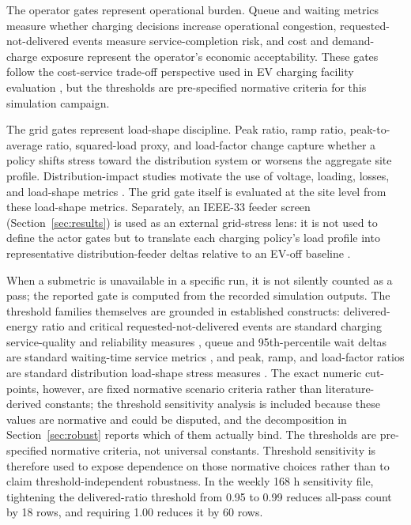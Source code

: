 \documentclass[12pt]{article}
\begin{document}
The operator gates represent operational burden. Queue and waiting metrics measure whether charging decisions increase operational congestion, requested-not-delivered events measure service-completion risk, and cost and demand-charge exposure represent the operator's economic acceptability. These gates follow the cost-service trade-off perspective used in EV charging facility evaluation \cite{woo2021}, but the thresholds are pre-specified normative criteria for this simulation campaign.

The grid gates represent load-shape discipline. Peak ratio, ramp ratio, peak-to-average ratio, squared-load proxy, and load-factor change capture whether a policy shifts stress toward the distribution system or worsens the aggregate site profile. Distribution-impact studies motivate the use of voltage, loading, losses, and load-shape metrics \cite{clement2010,elnozahy2014,green2011,muratori2018,dubey2015,pieltain2011,powell2022}. The grid gate itself is evaluated at the site level from these load-shape metrics. Separately, an IEEE-33 feeder screen (Section~\ref{sec:results}) is used as an external grid-stress lens: it is not used to define the actor gates but to translate each charging policy's load profile into representative distribution-feeder deltas relative to an EV-off baseline \cite{baran1989,thurner2018,pandapowerdoc}.

When a submetric is unavailable in a specific run, it is not silently counted as a pass; the reported gate is computed from the recorded simulation outputs. The threshold families themselves are grounded in established constructs: delivered-energy ratio and critical requested-not-delivered events are standard charging service-quality and reliability measures \cite{woo2021,danner2021,tan2023fair}, queue and 95th-percentile wait deltas are standard waiting-time service metrics \cite{tan2023fair,theodoropoulos2022proportional}, and peak, ramp, and load-factor ratios are standard distribution load-shape stress measures \cite{clement2010,muratori2018,powell2022}. The exact numeric cut-points, however, are fixed normative scenario criteria rather than literature-derived constants; the threshold sensitivity analysis is included because these values are normative and could be disputed, and the decomposition in Section~\ref{sec:robust} reports which of them actually bind. The thresholds are pre-specified normative criteria, not universal constants. Threshold sensitivity is therefore used to expose dependence on those normative choices rather than to claim threshold-independent robustness. In the weekly 168 h sensitivity file, tightening the delivered-ratio threshold from 0.95 to 0.99 reduces all-pass count by 18 rows, and requiring 1.00 reduces it by 60 rows.
\end{document}
